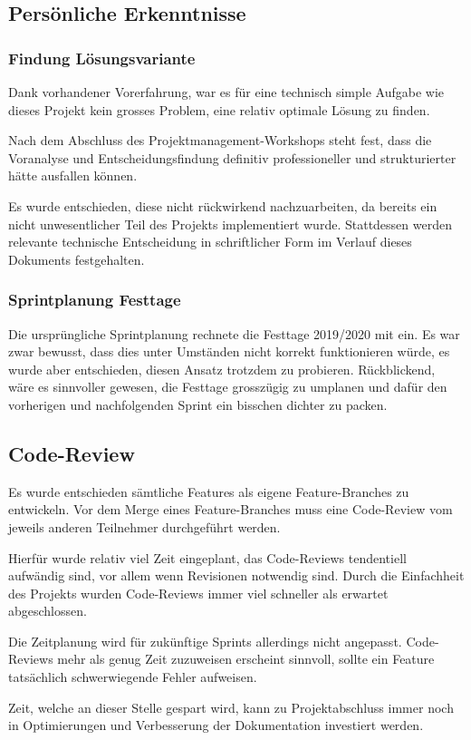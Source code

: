 \subsection{Persönliche Erkenntnisse}
\subsubsection*{Findung Lösungsvariante}
Dank vorhandener Vorerfahrung, war es für eine technisch simple Aufgabe wie dieses Projekt kein grosses Problem, eine relativ optimale Lösung zu finden.

Nach dem Abschluss des Projektmanagement-Workshops steht fest, dass die Voranalyse und Entscheidungsfindung definitiv professioneller und strukturierter hätte ausfallen können.

Es wurde entschieden, diese nicht rückwirkend nachzuarbeiten, da bereits ein nicht unwesentlicher Teil des Projekts implementiert wurde. Stattdessen werden relevante technische Entscheidung in schriftlicher Form im Verlauf dieses Dokuments festgehalten.

\subsubsection*{Sprintplanung Festtage}
Die ursprüngliche Sprintplanung rechnete die Festtage 2019/2020 mit ein.
Es war zwar bewusst, dass dies unter Umständen nicht korrekt funktionieren würde, es wurde aber entschieden, diesen Ansatz trotzdem zu probieren.
Rückblickend, wäre es sinnvoller gewesen, die Festtage grosszügig zu umplanen und dafür den vorherigen und nachfolgenden Sprint ein bisschen dichter zu packen.

\subsection*{Code-Review}
Es wurde entschieden sämtliche Features als eigene Feature-Branches zu entwickeln. Vor dem Merge eines Feature-Branches muss eine Code-Review vom jeweils anderen Teilnehmer durchgeführt werden.

Hierfür wurde relativ viel Zeit eingeplant, das Code-Reviews tendentiell aufwändig sind, vor allem wenn Revisionen notwendig sind. Durch die Einfachheit des Projekts wurden Code-Reviews immer viel schneller als erwartet abgeschlossen.

Die Zeitplanung wird für zukünftige Sprints allerdings nicht angepasst. Code-Reviews mehr als genug Zeit zuzuweisen erscheint sinnvoll, sollte ein Feature tatsächlich schwerwiegende Fehler aufweisen.

Zeit, welche an dieser Stelle gespart wird, kann zu Projektabschluss immer noch in Optimierungen und Verbesserung der Dokumentation investiert werden.
